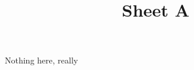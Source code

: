 \documentclass[a4paper]{article}
\title{Sheet A}
\begin{document}
\maketitle

Nothing here, really
\end{document}
